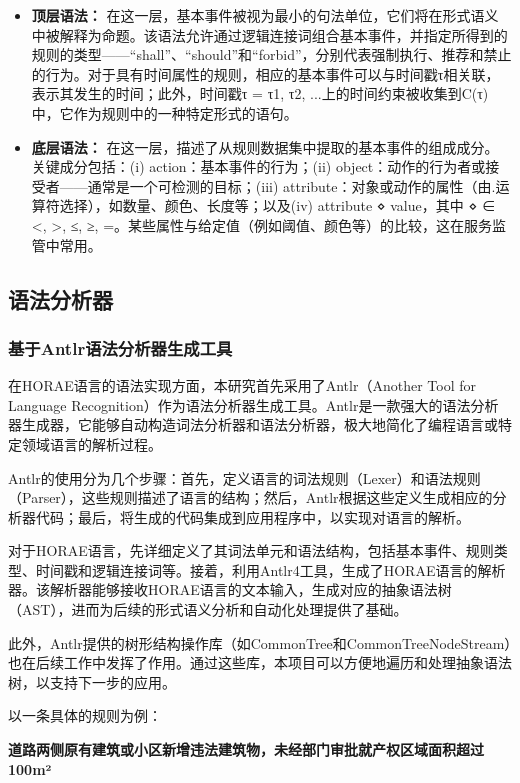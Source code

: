 \begin{itemize}
    \item \textbf{顶层语法：} 在这一层，基本事件被视为最小的句法单位，它们将在形式语义中被解释为命题。该语法允许通过逻辑连接词组合基本事件，并指定所得到的规则的类型——“shall”、“should”和“forbid”，分别代表强制执行、推荐和禁止的行为。对于具有时间属性的规则，相应的基本事件可以与时间戳τ相关联，表示其发生的时间；此外，时间戳τ = {τ1, τ2, ...}上的时间约束被收集到C(τ)中，它作为规则中的一种特定形式的语句。
    \item \textbf{底层语法：} 在这一层，描述了从规则数据集中提取的基本事件的组成成分。关键成分包括：(i) action：基本事件的行为；(ii) object：动作的行为者或接受者——通常是一个可检测的目标；(iii) attribute：对象或动作的属性（由.运算符选择），如数量、颜色、长度等；以及(iv) attribute ⋄ value，其中 ⋄ ∈ {<, >, ≤, ≥, =}。某些属性与给定值（例如阈值、颜色等）的比较，这在服务监管中常用。
\end{itemize}

\subsection{语法分析器}

\subsubsection{基于Antlr语法分析器生成工具}

在HORAE语言的语法实现方面，本研究首先采用了Antlr（Another Tool for Language Recognition）作为语法分析器生成工具。Antlr是一款强大的语法分析器生成器，它能够自动构造词法分析器和语法分析器，极大地简化了编程语言或特定领域语言的解析过程。

Antlr的使用分为几个步骤：首先，定义语言的词法规则（Lexer）和语法规则（Parser），这些规则描述了语言的结构；然后，Antlr根据这些定义生成相应的分析器代码；最后，将生成的代码集成到应用程序中，以实现对语言的解析。

对于HORAE语言，先详细定义了其词法单元和语法结构，包括基本事件、规则类型、时间戳和逻辑连接词等。接着，利用Antlr4工具，生成了HORAE语言的解析器。该解析器能够接收HORAE语言的文本输入，生成对应的抽象语法树（AST），进而为后续的形式语义分析和自动化处理提供了基础。

此外，Antlr提供的树形结构操作库（如CommonTree和CommonTreeNodeStream）也在后续工作中发挥了作用。通过这些库，本项目可以方便地遍历和处理抽象语法树，以支持下一步的应用。

以一条具体的规则为例：

\textbf{道路两侧原有建筑或小区新增违法建筑物，未经部门审批就产权区域面积超过100m²}


